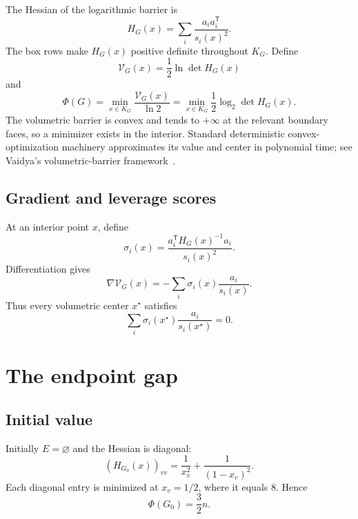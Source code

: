 \documentclass[11pt]{article}
\theoremstyle{definition}
\newcommand{\PhiV}{\Phi}
\newcommand{\Vnat}{\mathcal{V}}
\begin{document}
The Hessian of the logarithmic barrier is
\begin{equation}
  H_G(x)=\sum_i\frac{a_i a_i^{\mathsf T}}{s_i(x)^2}.
  \label{eq:H}
\end{equation}
The box rows make $H_G(x)$ positive definite throughout $K_G$.  Define
\begin{equation}
  \Vnat_G(x)=\frac12\ln\det H_G(x)
  \label{eq:Vnat}
\end{equation}
and
\begin{equation}
  \boxed{
  \PhiV(G)=\min_{x\in K_G}\frac{\Vnat_G(x)}{\ln2}
  =\min_{x\in K_G}\frac12\log_2\det H_G(x).
  }
  \label{eq:potential}
\end{equation}
The volumetric barrier is convex and tends to $+\infty$ at the relevant boundary faces, so a minimizer exists in the interior.  Standard deterministic convex-optimization machinery approximates its value and center in polynomial time; see Vaidya's volumetric-barrier framework~\cite{Vaidya1996}.

\subsection{Gradient and leverage scores}
At an interior point $x$, define
\begin{equation}
  \sigma_i(x)=\frac{a_i^{\mathsf T}H_G(x)^{-1}a_i}{s_i(x)^2}.
  \label{eq:leverage}
\end{equation}
Differentiation gives
\begin{equation}
  \nabla\Vnat_G(x)
  =-\sum_i\sigma_i(x)\frac{a_i}{s_i(x)}.
  \label{eq:gradient}
\end{equation}
Thus every volumetric center $x^\star$ satisfies
\begin{equation}
  \sum_i\sigma_i(x^\star)\frac{a_i}{s_i(x^\star)}=0.
  \label{eq:center-unwhite}
\end{equation}

\section{The endpoint gap}

\subsection{Initial value}
Initially $E=\varnothing$ and the Hessian is diagonal:
\[
  (H_{G_0}(x))_{vv}=\frac1{x_v^2}+\frac1{(1-x_v)^2}.
\]
Each diagonal entry is minimized at $x_v=1/2$, where it equals $8$.  Hence
\begin{equation}
  \boxed{\PhiV(G_0)=\frac32n.}
  \label{eq:initial}
\end{equation}
\end{document}
